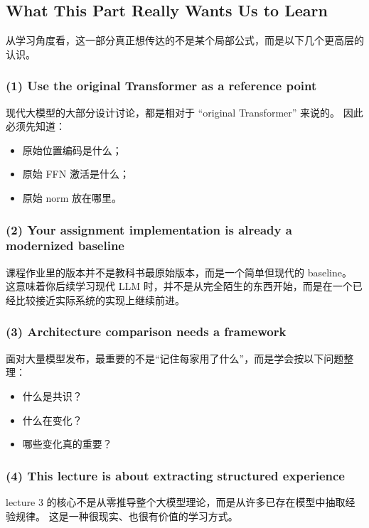 \documentclass[a4paper,UTF8]{article}
\numberwithin{equation}{section}
\begin{document}
\subsection{What This Part Really Wants Us to Learn}

从学习角度看，这一部分真正想传达的不是某个局部公式，而是以下几个更高层的认识。

\subsubsection{(1) Use the original Transformer as a reference point}

现代大模型的大部分设计讨论，都是相对于 ``original Transformer'' 来说的。  
因此必须先知道：
\begin{itemize}
    \item 原始位置编码是什么；
    \item 原始 FFN 激活是什么；
    \item 原始 norm 放在哪里。
\end{itemize}

\subsubsection{(2) Your assignment implementation is already a modernized baseline}

课程作业里的版本并不是教科书最原始版本，而是一个简单但现代的 baseline。  
这意味着你后续学习现代 LLM 时，并不是从完全陌生的东西开始，而是在一个已经比较接近实际系统的实现上继续前进。

\subsubsection{(3) Architecture comparison needs a framework}

面对大量模型发布，最重要的不是“记住每家用了什么”，而是学会按以下问题整理：
\begin{itemize}
    \item 什么是共识？
    \item 什么在变化？
    \item 哪些变化真的重要？
\end{itemize}

\subsubsection{(4) This lecture is about extracting structured experience}

lecture 3 的核心不是从零推导整个大模型理论，而是从许多已存在模型中抽取经验规律。  
这是一种很现实、也很有价值的学习方式。
\end{document}
